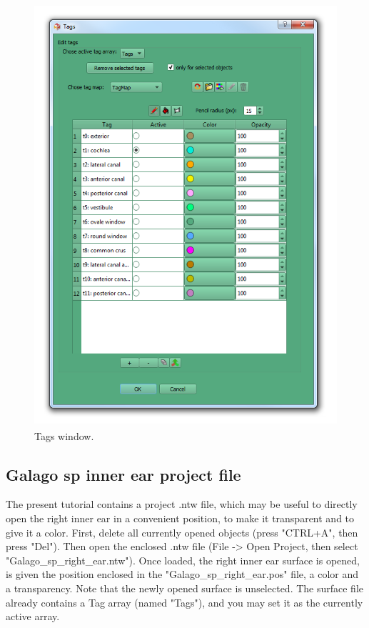 \documentclass[12pt, a4paper]{book}
\begin{document}
\begin{figure}
  \centering
  \includegraphics[scale=0.5]{tags_window.png}
\caption{Tags window.}	
\label{tags_window}
 \end{figure}


\subsection{Galago sp inner ear project file}
The present tutorial contains a project .ntw file, which may be useful to directly open the right inner ear
 in a convenient position, to make it transparent and to give it a color. First, delete all currently opened objects
(press "CTRL+A", then press "Del"). Then open the enclosed .ntw file (File -> Open Project, then select
"Galago\_sp\_right\_ear.ntw"). Once loaded, the right inner ear surface is opened, is given the position
enclosed in the "Galago\_sp\_right\_ear.pos" file, a color and a transparency. Note that the newly opened
surface is unselected. The surface file already contains a Tag array (named "Tags"), and you may set it as the currently active array.\\
\end{document}
